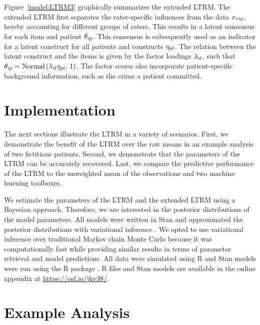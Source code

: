 \documentclass[a4paper,usenames,dvipsnames]{article}
\newcommand{\osflink}{\url{https://osf.io/jkv38/}}
\begin{document}
Figure~\ref{model:LTRM3} graphically summarizes the extended LTRM. The extended LTRM first separates the rater-specific influences from the data $x_{rip}$, hereby accounting for different groups of raters. This results in a latent consensus for each item and patient $\theta_{ip}$. This consensus is subsequently used as an indicator for a latent construct for all patients and constructs $\eta_{pl}$. The relation between the latent construct and the items is given by the factor loadings $\lambda_{il}$, such that $\theta_{ip} \sim \text{Normal}\left(\lambda_{il}\eta_{pl},\,1\right)$. The factor scores also incorporate patient-specific background information, such as the crime a patient committed.

\section*{Implementation}
The next sections illustrate the LTRM in a variety of scenarios. First, we demonstrate the benefit of the LTRM over the raw means in an example analysis of two fictitious patients. Second, we demonstrate that the parameters of the LTRM can be accurately recovered. Last, we compare the predictive performance of the LTRM to the unweighted mean of the observations and two machine learning toolboxes.

We estimate the parameters of the LTRM and the extended LTRM using a Bayesian approach. Therefore, we are interested in the posterior distributions of the model parameters. All models were written in Stan and approximated the posterior distributions with variational inference \cite{CarpenterEtAl2017Stan}. We opted to use variational inference over traditional Markov chain Monte Carlo because it was computationally fast while providing similar results in terms of parameter retrieval and model predictions. All data were simulated using R \cite{R} and Stan models were run using the R package  \cite{rstan2019a2192}. R files and Stan models are available in the online appendix at \osflink{}.

\section*{Example Analysis}
\end{document}
